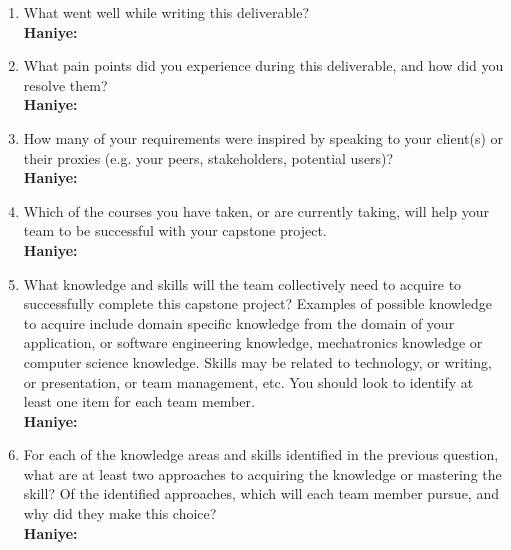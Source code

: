 \begin{enumerate}
  \item What went well while writing this deliverable?
  \\\textbf{Haniye:}
  \item What pain points did you experience during this deliverable, and how did
  you resolve them?
  \\\textbf{Haniye:}
  \item How many of your requirements were inspired by speaking to your
  client(s) or their proxies (e.g. your peers, stakeholders, potential users)?
  \\\textbf{Haniye:}
  \item Which of the courses you have taken, or are currently taking, will help
  your team to be successful with your capstone project.
  \\\textbf{Haniye:}
  \item What knowledge and skills will the team collectively need to acquire to
  successfully complete this capstone project?  Examples of possible knowledge
  to acquire include domain specific knowledge from the domain of your
  application, or software engineering knowledge, mechatronics knowledge or
  computer science knowledge.  Skills may be related to technology, or writing,
  or presentation, or team management, etc.  You should look to identify at
  least one item for each team member.
  \\\textbf{Haniye:}
  \item For each of the knowledge areas and skills identified in the previous
  question, what are at least two approaches to acquiring the knowledge or
  mastering the skill?  Of the identified approaches, which will each team
  member pursue, and why did they make this choice?
  \\\textbf{Haniye:}
\end{enumerate}
